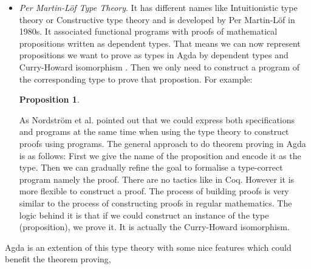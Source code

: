 \documentclass{article}
\newcommand{\Varid}[1]{\mathit{#1}}
\def\resethooks{%
  \global\let\SaveRestoreHook\empty
  \global\let\ColumnHook\empty}
\let\hspre\empty
\let\hspost\empty
\renewcommand\Varid[1]{\mathord{\textsf{#1}}}
\theoremstyle{definition}
\newtheorem{proposition}[theorem]{Proposition}
\begin{document}
\begin{itemize}
\item \textit{Per Martin-Löf Type Theory}. It has different names like Intuitionistic type theory or Constructive type theory and is developed by Per Martin-Löf in 1980s. It associated functional programs with proofs of mathematical propositions written as dependent types. That means we can now represent propositions we want to prove as types in Agda by dependent types and Curry-Howard isomorphism \cite{aboa}. Then we only need to construct a program of the corresponding type to prove that propostion. For example:

\begin{proposition}
\resethooks
\end{proposition}

As Nordström et al. \cite{nps} pointed out that we could express both specifications and programs at the same time when using the type theory to construct proofs using programs. The general approach to do theorem proving in Agda is as follows: First we give the name of the proposition and encode it as the type. Then we can gradually refine the goal to formalise a type-correct program namely the proof. There are no tactics like in Coq. However it is more flexible to construct a proof. The process of building proofs is very similar to the process of constructing proofs in regular mathematics. The logic behind it is that if we could construct an instance of the type (proposition), we prove it. It is actually the Curry-Howard isomorphism.

\end{itemize}

Agda is an extention of this type theory \cite{itt} with some nice features which could benefit the theorem proving,
\end{document}
